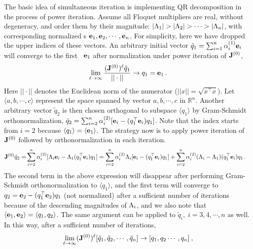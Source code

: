 The basic idea of simultaneous iteration is implementing QR decomposition
in the process of power iteration. Assume all Floquet multipliers
are real, without degeneracy, and order them by their
magnitude: $|\ExpaEig_{1}|>|\ExpaEig_{2}|>\cdots >|\ExpaEig_{n}|$, with
corresponding normalized \Fv s
$\jEigvec[1], \jEigvec[2],\cdots, \jEigvec[n]$.
For simplicity, here we have dropped the upper indices of these vectors.
An arbitrary initial vector
$\tilde{q}_{1}=\sum_{i=1}^{n}\alpha^{(1)}_{i}\jEigvec[i]$ will converge to the
first \Fv\ $\jEigvec[1]$ after normalization under power iteration of
$\ps{\jMps}{0}$,
\[
  \lim_{\ell\to \infty }\frac{(\ps{\jMps}{0})^{\ell}\tilde{q}_{1}}{||\cdot||}
  \to q_{1}=\jEigvec[1]
  \,.
\]
Here $||\cdot||$ denotes the Euclidean norm of the numerator
($||x||=\sqrt{x^\top x}$). Let $\langle a,b,\cdots,c\rangle$ represent
the space spanned by vector $a,b,\cdots,c$ in $\mathbb{R}^n$. Another
arbitrary vector $\tilde{q}_{2}$ is then chosen orthogonal to subspace
$\langle q_{1} \rangle$ by Gram-Schmidt orthonormalization,
$\tilde{q}_{2}= \sum_{i=2}^{n}\alpha^{(2)}_{i}[\jEigvec[i]-(q_{1}^\top
\jEigvec[i])q_{1}]$.
Note that the index starts from $i=2$ because $\langle q_{1}
\rangle=\langle {\jEigvec[1]} \rangle$. The strategy now is to apply power
iteration of $\ps{\jMps}{0}$ followed by orthonormalization in each
iteration.
\begin{align*}
  \ps{\jMps}{0}\tilde{q}_{2}= &\sum_{i=2}^{n}\alpha^{(2)}_{i}
                                [\ExpaEig_{i}\jEigvec[i]-\ExpaEig_{1}(q_{1}^\top \jEigvec[i])q_1]
                                = \sum_{i=2}^{n}\alpha^{(2)}_{i}\ExpaEig_{i}[\jEigvec[i]-
                                (q_{1}^\top \jEigvec[i])q_{1}]+\sum_{i=2}^{n}\alpha^{(2)}_{i}
                                (\ExpaEig_{i}-\ExpaEig_{1})(q_{1}^\top \jEigvec[i])q_{1}
                                \,.
\end{align*}
The second term in the above expression will disappear after performing
Gram-Schmidt orthonormalization to $\langle q_{1} \rangle$, and the first
term will converge to
$q_{2}=\jEigvec[2]-(q_{1}^\top \jEigvec[2])q_{1}$ (not
normalized) after a sufficient number of iterations because of the
descending magnitudes of $\ExpaEig_{i}$, and we also note that $\langle
{\jEigvec[1], \jEigvec[2]} \rangle=\langle q_{1}, q_{2}\rangle$. The same argument can
be applied to $\tilde{q}_{i},\;i=3,4,\cdots,n$ as well.
In this way, after a sufficient number of iterations,
\[
  \lim_{\ell\to \infty}(\ps{\jMps}{0})^{\ell}[\tilde{q}_{1},\tilde{q}_{2},\cdots,
  \tilde{q}_{n}]
  \to [q_{1},q_{2}\cdots, q_{n}]
  \:,
\]
